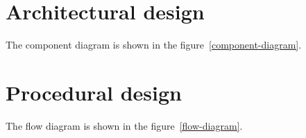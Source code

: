\section{Architectural design}
\nonzeroparskip The component diagram is shown in the figure~\ref{component-diagram}.


\section{Procedural design}
\nonzeroparskip The flow diagram is shown in the figure~\ref{flow-diagram}.

